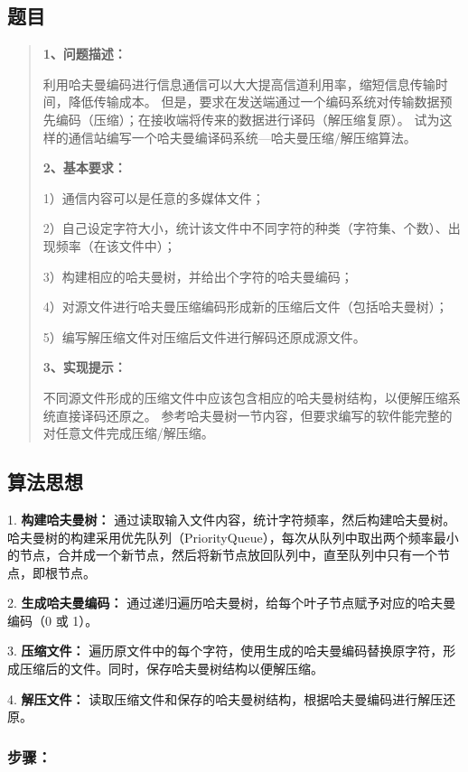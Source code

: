 \documentclass[UTF8]{ctexart}
\begin{document}
\subsection*{题目}
\begin{abstract}
    \textbf{1、问题描述：}

    利用哈夫曼编码进行信息通信可以大大提高信道利用率，缩短信息传输时间，降低传输成本。
    但是，要求在发送端通过一个编码系统对传输数据预先编码（压缩）；在接收端将传来的数据进行译码（解压缩复原）。
    试为这样的通信站编写一个哈夫曼编译码系统---哈夫曼压缩/解压缩算法。

    \textbf{2、基本要求：}

    1）通信内容可以是任意的多媒体文件；

    2）自己设定字符大小，统计该文件中不同字符的种类（字符集、个数）、出现频率（在该文件中）；

    3）构建相应的哈夫曼树，并给出个字符的哈夫曼编码；
    
    4）对源文件进行哈夫曼压缩编码形成新的压缩后文件（包括哈夫曼树）；

    5）编写解压缩文件对压缩后文件进行解码还原成源文件。

    \textbf{3、实现提示：}

    不同源文件形成的压缩文件中应该包含相应的哈夫曼树结构，以便解压缩系统直接译码还原之。
    参考哈夫曼树一节内容，但要求编写的软件能完整的对任意文件完成压缩/解压缩。  

\end{abstract}


\subsection*{算法思想}

1. \textbf{构建哈夫曼树：} 通过读取输入文件内容，统计字符频率，然后构建哈夫曼树。哈夫曼树的构建采用优先队列（PriorityQueue），每次从队列中取出两个频率最小的节点，合并成一个新节点，然后将新节点放回队列中，直至队列中只有一个节点，即根节点。

2. \textbf{生成哈夫曼编码：} 通过递归遍历哈夫曼树，给每个叶子节点赋予对应的哈夫曼编码（0 或 1）。

3. \textbf{压缩文件：} 遍历原文件中的每个字符，使用生成的哈夫曼编码替换原字符，形成压缩后的文件。同时，保存哈夫曼树结构以便解压缩。

4. \textbf{解压文件：} 读取压缩文件和保存的哈夫曼树结构，根据哈夫曼编码进行解压还原。

\subsubsection*{步骤：}
\end{document}
